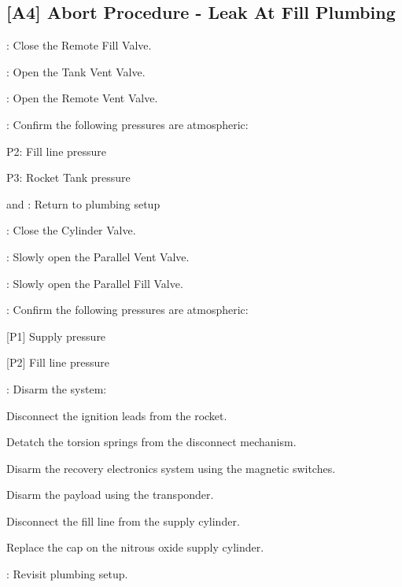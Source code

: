 \subsection{[A4] Abort Procedure - Leak At Fill Plumbing}
\begin{checklist}
    \item \control{}: Close the Remote Fill Valve.
    \item \control{}: Open the Tank Vent Valve.
    \item \control{}: Open the Remote Vent Valve.
    \item \control{}: Confirm the following pressures are atmospheric:
    \begin{checklist}
        \item P2: Fill line pressure
        \item P3: Rocket Tank pressure
    \end{checklist}
    \item \primary{} and \secondary{}: Return to plumbing setup
    \item \primary{}: Close the Cylinder Valve.
    \item \primary{}: Slowly open the Parallel Vent Valve.
    \item \primary{}: Slowly open the Parallel Fill Valve.
    \item \control{}: Confirm the following pressures are atmospheric:
    \begin{checklist}
        \item {[P1]} Supply pressure
        \item {[P2]} Fill line pressure
    \end{checklist}
    \item \primary{}: Disarm the system:
        \begin{checklist}    
            \item Disconnect the ignition leads from the rocket.
            \item Detatch the torsion springs from the disconnect mechanism.
            \item Disarm the recovery electronics system using the magnetic switches.
            \item Disarm the payload using the transponder.
            \item Disconnect the fill line from the supply cylinder.
            \item Replace the cap on the nitrous oxide supply cylinder.
        \end{checklist}
    \item \ops{}: Revisit plumbing setup.
\end{checklist}
\setcounter{checklistnum}{0}

